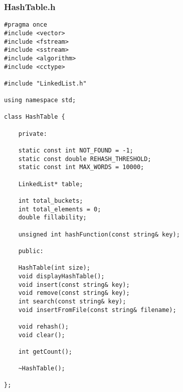 \documentclass[11pt,a4paper,final]{article} %
\begin{document}
\subsubsection*{HashTable.h}
\begin{lstlisting}
#pragma once
#include <vector>
#include <fstream> 
#include <sstream>
#include <algorithm>
#include <cctype>

#include "LinkedList.h"

using namespace std;

class HashTable {
	
	private: 
	
	static const int NOT_FOUND = -1;
	static const double REHASH_THRESHOLD;
	static const int MAX_WORDS = 10000;
	
	LinkedList* table;
	
	int total_buckets;
	int total_elements = 0;
	double fillability;
	
	unsigned int hashFunction(const string& key);
	
	public:
	
	HashTable(int size);
	void displayHashTable();
	void insert(const string& key);
	void remove(const string& key);
	int search(const string& key);
	void insertFromFile(const string& filename);
	
	void rehash();
	void clear();
	
	int getCount();
	
	~HashTable();
	
};
\end{lstlisting}
\end{document}
